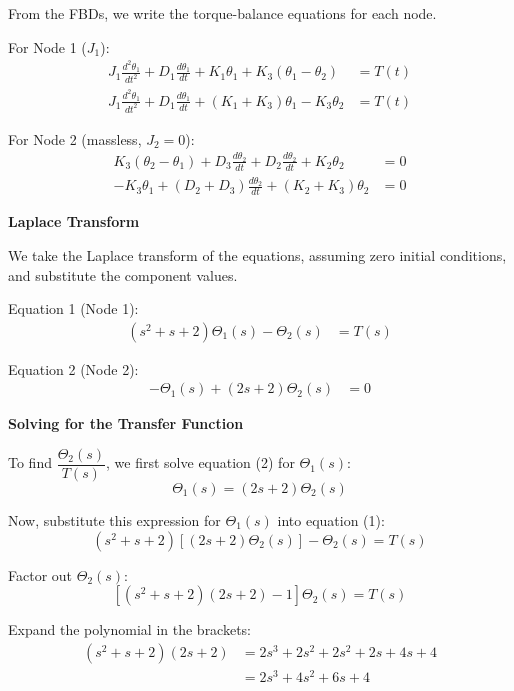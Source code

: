 \documentclass[11pt]{article}
\begin{document}
\vspace{8pt}

\noindent From the FBDs, we write the torque-balance equations for each node.

\vspace{8pt}
{For Node 1 ($J_1$):}
\begin{align*}
    J_1 \frac{d^2\theta_1}{dt^2} + D_1 \frac{d\theta_1}{dt} + K_1 \theta_1 + K_{3}(\theta_1 - \theta_2) &= T(t) \\
    J_1 \frac{d^2\theta_1}{dt^2} + D_1 \frac{d\theta_1}{dt} + (K_1 + K_{3})\theta_1 - K_{3}\theta_2 &= T(t)
\end{align*}

{For Node 2 (massless, $J_2 = 0$):}
\begin{align*}
    K_{3}(\theta_2 - \theta_1) + D_{3} \frac{d\theta_2}{dt} + D_2 \frac{d\theta_2}{dt} + K_2 \theta_2 &= 0 \\
    -K_{3}\theta_1 + (D_2 + D_{3})\frac{d\theta_2}{dt} + (K_2 + K_{3})\theta_2 &= 0
\end{align*}

\noindent\textbf{Laplace Transform}

\vspace{8pt}

\noindent We take the Laplace transform of the equations, assuming zero initial conditions, and substitute the component values.

\vspace{8pt}
{Equation 1 (Node 1):}
\begin{align}
    (s^2 + s + 2)\Theta_1(s) - \Theta_2(s) &= T(s) \tag{1}
\end{align}

{Equation 2 (Node 2):}
\begin{align}
    -\Theta_1(s) + (2s + 2)\Theta_2(s) &= 0 \tag{2}
\end{align}


\noindent\textbf{Solving for the Transfer Function}
\vspace{8pt}

To find $\dfrac{\Theta_2(s)}{T(s)}$, we first solve equation (2) for $\Theta_1(s)$:
\[
\Theta_1(s) = (2s + 2)\Theta_2(s)
\]

Now, substitute this expression for $\Theta_1(s)$ into equation (1):
\[
(s^2 + s + 2)\left[ (2s + 2)\Theta_2(s) \right] - \Theta_2(s) = T(s)
\]

Factor out $\Theta_2(s)$:
\[
\left[ (s^2 + s + 2)(2s + 2) - 1 \right] \Theta_2(s) = T(s)
\]

Expand the polynomial in the brackets:
\begin{align*}
(s^2 + s + 2)(2s + 2) &= 2s^3 + 2s^2 + 2s^2 + 2s + 4s + 4 \\
&= 2s^3 + 4s^2 + 6s + 4
\end{align*}
\end{document}
